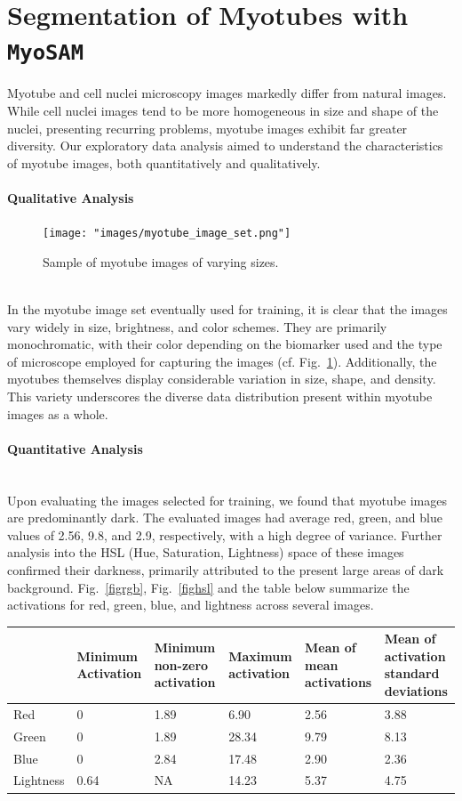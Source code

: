 \section{Segmentation of Myotubes with \texttt{MyoSAM}}\label{secsam}

Myotube and cell nuclei microscopy images markedly differ from natural images. While cell nuclei images tend to be more homogeneous in size and shape of the nuclei, presenting recurring problems, myotube images exhibit far greater diversity. Our exploratory data analysis aimed to understand the characteristics of myotube images, both quantitatively and qualitatively.

\paragraph{Qualitative Analysis}
\begin{figure}
	\centering
	\texttt{[image: "images/myotube\_image\_set.png"]}
	\caption[Sample myotube images]{Sample of myotube images of varying sizes.}
	\label{figsamplemyotubes}
\end{figure}
\ \\
In the myotube image set eventually used for training, it is clear that the images vary widely in size, brightness, and color schemes. They are primarily monochromatic, with their color depending on the biomarker used and the type of microscope employed for capturing the images (cf. Fig.~\ref{figsamplemyotubes}). Additionally, the myotubes themselves display considerable variation in size, shape, and density. This variety underscores the diverse data distribution present within myotube images as a whole.

\paragraph{Quantitative Analysis}
\ \\
Upon evaluating the images selected for training, we found that myotube images are predominantly dark. The evaluated images had average red, green, and blue values of 2.56, 9.8, and 2.9, respectively, with a high degree of variance. Further analysis into the HSL (Hue, Saturation, Lightness) space of these images confirmed their darkness, primarily attributed to the present large areas of dark background. Fig.~\ref{figrgb}, Fig.~\ref{fighsl} and the table below summarize the activations for red, green, blue, and lightness across several images.

\begin{tabular}{|p{2cm}|p{2cm}|p{2cm}|p{2cm}|p{2cm}|p{2cm}|}
	\hline
	& Minimum Activation & Minimum non-zero  activation & Maximum activation & Mean of mean activations & Mean of activation standard deviations \\
	\hline
	Red & 0 & 1.89 & 6.90 & 2.56 & 3.88 \\
	\hline
	Green & 0 & 1.89 & 28.34 & 9.79 & 8.13 \\
	\hline
	Blue & 0 & 2.84 & 17.48 & 2.90 & 2.36 \\
	\hline
	Lightness & 0.64 & NA & 14.23 & 5.37 & 4.75 \\
	\hline
\end{tabular}

